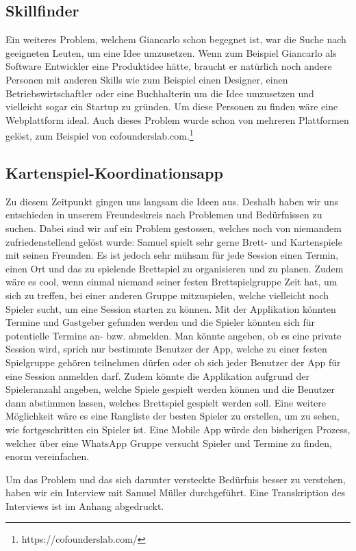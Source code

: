  \subsection{Skillfinder}
 Ein weiteres Problem, welchem Giancarlo schon begegnet ist, war die Suche nach geeigneten Leuten, um eine Idee umzusetzen. Wenn zum Beispiel Giancarlo als Software Entwickler eine Produktidee hätte, braucht er natürlich noch andere Personen mit anderen Skills wie zum Beispiel einen Designer, einen Betriebswirtschaftler oder eine Buchhalterin um die Idee umzusetzen und vielleicht sogar ein Startup zu gründen. Um diese Personen zu finden wäre eine Webplattform ideal. Auch dieses Problem wurde schon von mehreren Plattformen gelöst, zum Beispiel von cofounderslab.com.\footnote{https://cofounderslab.com/}
 
\subsection{Kartenspiel-Koordinationsapp}
Zu diesem Zeitpunkt gingen uns langsam die Ideen aus. Deshalb haben wir uns entschieden in unserem Freundeskreis nach Problemen und Bedürfnissen zu suchen. Dabei sind wir auf ein Problem gestossen, welches noch von niemandem zufriedenstellend gelöst wurde:
Samuel spielt sehr gerne Brett- und Kartenspiele mit seinen Freunden. Es ist jedoch sehr mühsam für jede Session einen Termin, einen Ort und das zu spielende Brettspiel zu organisieren und zu planen. Zudem wäre es cool, wenn einmal niemand seiner festen Brettspielgruppe Zeit hat, um sich zu treffen, bei einer anderen Gruppe mitzuspielen, welche vielleicht noch Spieler sucht, um eine Session starten zu können. 	
Mit der Applikation könnten Termine und Gastgeber gefunden werden und die Spieler könnten sich für potentielle Termine an- bzw. abmelden. Man könnte angeben, ob es eine private Session wird, sprich nur bestimmte Benutzer der App, welche zu einer festen Spielgruppe gehören teilnehmen dürfen oder ob sich jeder Benutzer der App für eine Session anmelden darf.  Zudem könnte die Applikation aufgrund der Spieleranzahl angeben, welche Spiele gespielt werden können und die Benutzer dann abstimmen lassen, welches Brettspiel gespielt werden soll. Eine weitere Möglichkeit wäre es eine Rangliste der besten Spieler zu erstellen, um zu sehen, wie fortgeschritten ein Spieler ist.
Eine Mobile App würde den bisherigen Prozess, welcher über eine WhatsApp Gruppe versucht Spieler und Termine zu finden, enorm vereinfachen.

Um das Problem und das sich darunter versteckte Bedürfnis besser zu verstehen, haben wir ein Interview mit Samuel Müller durchgeführt. Eine Transkription des Interviews ist im Anhang abgedruckt.